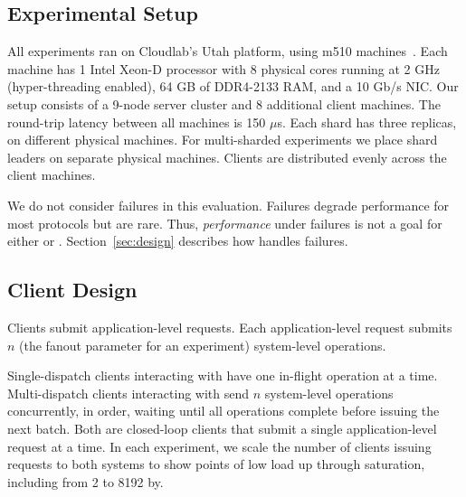 
\subsection{Experimental Setup}
All experiments ran on Cloudlab's Utah platform, using
m510 machines~\cite{duplyakin2019cloudlab}.  Each machine has 1 Intel Xeon-D processor with 8 physical cores
running at 2 GHz (hyper-threading enabled), 64 GB of DDR4-2133 RAM, and a 10
Gb/s NIC\@.  Our setup consists of a 9-node server cluster and 8 additional client machines.
The round-trip latency between all machines is 150 $\mu$s.  Each shard has three replicas,
on different physical machines. For multi-sharded experiments we place
shard leaders on separate physical machines. Clients are distributed
evenly across the client machines.


We do not consider failures in this evaluation. Failures degrade performance for
most protocols but are rare. Thus, \emph{performance} under failures is not a goal
for either \mpaxos{} or \system{}. Section~\ref{sec:design} describes how \system{}
handles failures.



\subsection{Client Design}
Clients submit application-level requests. Each application-level request
submits $n$ (the fanout parameter for an experiment) system-level operations.

Single-dispatch clients interacting with \mpaxos{} have one in-flight operation at
a time. Multi-dispatch clients interacting with \system{} send $n$ system-level
operations concurrently, in order, waiting until all operations complete before
issuing the next batch. Both are closed-loop clients that submit a single
application-level request at a time.
In each experiment, we scale the number of clients issuing requests to both
systems to show points of low load up through saturation, including from 2 to 8192 by.

